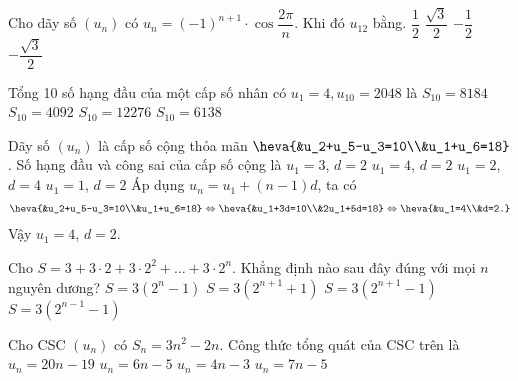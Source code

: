 \begin{ex}%
Cho dãy số $(u_n)$ có $u_n=(-1)^{n+1} \cdot \cos  \dfrac{2 \pi}{n} $. Khi đó $u_{12}$ bằng.
\choice
{$\dfrac{1}{2}$}
{$\dfrac{\sqrt{3}}{2}$}
{$-\dfrac{1}{2}$}
{\True $-\dfrac{\sqrt{3}}{2}$}
\end{ex}

\begin{ex}%
Tổng 10 số hạng đầu của một cấp số nhân có $u_1=4,{u_{10}}=2048$ là
\choice
{${{S}_{10}}=8184$}
{${{S}_{10}}=4092$}
{\True ${{S}_{10}}=12276$}
{${{S}_{10}}=6138$}
\end{ex}

\begin{ex}%
Dãy số $(u_n)$ là cấp số cộng thỏa mãn $\heva{&u_2+u_5-u_3=10\\&u_1+u_6=18}$. Số hạng đầu và công sai của cấp số cộng là
\choice
{$u_1=3$, $d=2$}
{\True $u_1=4$, $d=2$}
{$u_1=2$, $d=4$}
{$u_1=1$, $d=2$}
\loigiai
{Áp dụng $u_n=u_1+(n-1)d$, ta có
\begin{eqnarray*}
\heva{&u_2+u_5-u_3=10\\&u_1+u_6=18}\Leftrightarrow \heva{&u_1+3d=10\\&2u_1+5d=18}\Leftrightarrow \heva{&u_1=4\\&d=2.}
\end{eqnarray*}
Vậy $u_1=4$, $d=2$.
}
\end{ex}

\begin{ex}%
Cho $S=3+3\cdot 2+3\cdot2^2+\ldots+3\cdot2^n$. Khẳng định nào sau đây đúng với mọi $n$ nguyên dương?
\choice
{$S=3\left( 2^n-1 \right)$}
{$S=3\left( {2^{n+1}}+1 \right)$}
{\True $S=3\left( {2^{n+1}}-1 \right)$}
{$S=3\left( {2^{n-1}}-1 \right)$}
\end{ex}

\begin{ex}%
Cho CSC $(u_n)$ có $S_n=3n^2-2n$. Công thức tổng quát của CSC trên là
\choice
{$u_n=20n-19$}
{\True $u_n=6n-5$}
{$u_n=4n-3$}
{$u_n=7n-5$}
\end{ex}

